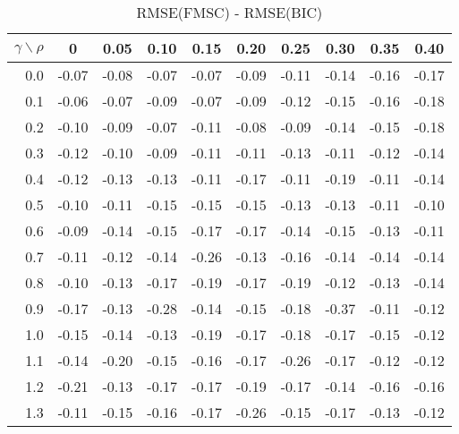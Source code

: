 \documentclass[12pt]{article}
\begin{document}
\begin{table}[!tbp]
\caption{RMSE(FMSC) - RMSE(BIC)}
 \begin{center}
 \begin{tabular}{r|rrrrrrrrr}\hline\hline
\multicolumn{1}{c|}{$\gamma\backslash\rho$}&\multicolumn{1}{c}{0}&\multicolumn{1}{c}{0.05}&\multicolumn{1}{c}{0.10}&\multicolumn{1}{c}{0.15}&\multicolumn{1}{c}{0.20}&\multicolumn{1}{c}{0.25}&\multicolumn{1}{c}{0.30}&\multicolumn{1}{c}{0.35}&\multicolumn{1}{c}{0.40}\tabularnewline
\hline

0.0&-0.07&-0.08&-0.07&-0.07&-0.09&-0.11&-0.14&-0.16&-0.17\tabularnewline
0.1&-0.06&-0.07&-0.09&-0.07&-0.09&-0.12&-0.15&-0.16&-0.18\tabularnewline
0.2&-0.10&-0.09&-0.07&-0.11&-0.08&-0.09&-0.14&-0.15&-0.18\tabularnewline
0.3&-0.12&-0.10&-0.09&-0.11&-0.11&-0.13&-0.11&-0.12&-0.14\tabularnewline
0.4&-0.12&-0.13&-0.13&-0.11&-0.17&-0.11&-0.19&-0.11&-0.14\tabularnewline
0.5&-0.10&-0.11&-0.15&-0.15&-0.15&-0.13&-0.13&-0.11&-0.10\tabularnewline
0.6&-0.09&-0.14&-0.15&-0.17&-0.17&-0.14&-0.15&-0.13&-0.11\tabularnewline
0.7&-0.11&-0.12&-0.14&-0.26&-0.13&-0.16&-0.14&-0.14&-0.14\tabularnewline
0.8&-0.10&-0.13&-0.17&-0.19&-0.17&-0.19&-0.12&-0.13&-0.14\tabularnewline
0.9&-0.17&-0.13&-0.28&-0.14&-0.15&-0.18&-0.37&-0.11&-0.12\tabularnewline
1.0&-0.15&-0.14&-0.13&-0.19&-0.17&-0.18&-0.17&-0.15&-0.12\tabularnewline
1.1&-0.14&-0.20&-0.15&-0.16&-0.17&-0.26&-0.17&-0.12&-0.12\tabularnewline
1.2&-0.21&-0.13&-0.17&-0.17&-0.19&-0.17&-0.14&-0.16&-0.16\tabularnewline
1.3&-0.11&-0.15&-0.16&-0.17&-0.26&-0.15&-0.17&-0.13&-0.12\tabularnewline
\hline
\end{tabular}

\end{center}

\end{table}

%
\end{document}
